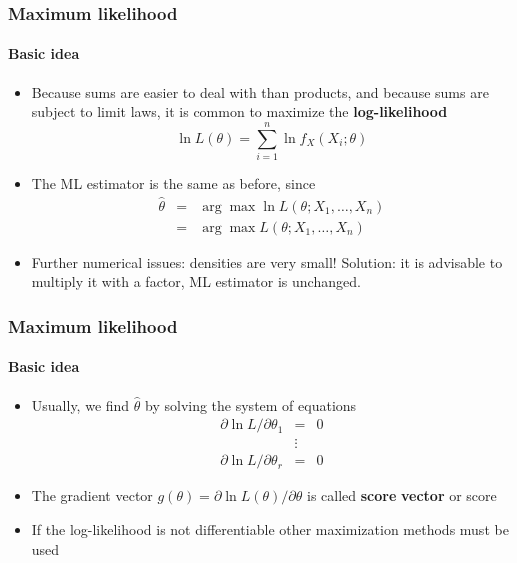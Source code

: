 \documentclass[notes=show]{beamer}
\begin{document}
\begin{frame}\frametitle{Maximum likelihood}\framesubtitle{Basic idea}
\begin{itemize}
    \item Because sums are easier to deal with than products, \newline
    and because sums are subject to limit laws, it is \newline
    common to maximize the \textbf{log-likelihood}
    \begin{equation*}
        \ln L(\theta )=\sum_{i=1}^{n}\ln f_{X}(X_{i};\theta )
    \end{equation*}
    \item The ML estimator is the same as before, since
    \begin{eqnarray*}
        \hat{\theta} &=&\arg \max \ln L(\theta ;X_{1},\ldots ,X_{n}) \\
        &=&\arg \max L(\theta ;X_{1},\ldots ,X_{n})
    \end{eqnarray*}
    \item Further numerical issues: densities are very small! Solution: it is advisable to multiply it with a factor, ML estimator is unchanged.
\end{itemize}
\end{frame}


\begin{frame}\frametitle{Maximum likelihood}\framesubtitle{Basic idea}
\begin{itemize}
    \item Usually, we find $\hat{\theta}$ by solving the system of equations
    \begin{eqnarray*}
        \partial \ln L/\partial \theta _{1} &=&0 \\
        &\vdots & \\
        \partial \ln L/\partial \theta _{r} &=&0
    \end{eqnarray*}
    \item The gradient vector $g(\theta )=\partial \ln L(\theta )/\partial \theta $ is called \newline
    \textbf{score} \textbf{vector} or score
    \item If the log-likelihood is not differentiable other maximization methods must be used
\end{itemize}
\end{frame}
\end{document}
